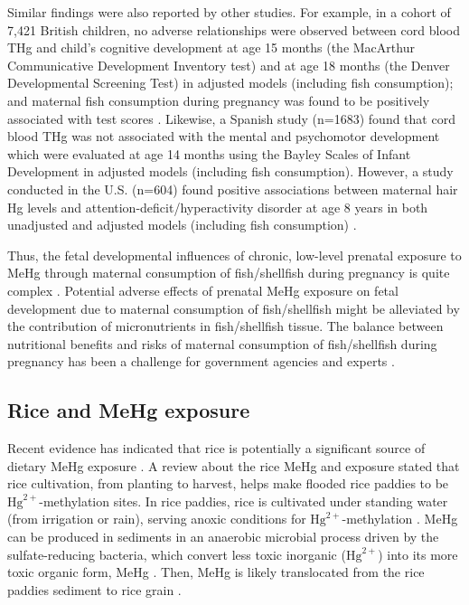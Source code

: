 Similar findings were also reported by other studies. For example, in a cohort of 7,421 British children, no adverse relationships were observed between cord blood THg and child's cognitive development at age 15 months (the MacArthur Communicative Development Inventory test) and at age 18 months (the Denver Developmental Screening Test) in adjusted models (including fish consumption); and maternal fish consumption during pregnancy was found to be positively associated with test scores \citep{daniels2004fish}. Likewise, a Spanish study (n=1683) found that cord blood THg was not associated with the mental and psychomotor development which were evaluated at age 14 months using the Bayley Scales of Infant Development \citep{llop2012prenatal} in adjusted models (including fish consumption). However, a study conducted in the U.S. (n=604) found positive associations between maternal hair Hg levels and attention-deficit/hyperactivity disorder at age 8 years in both unadjusted and adjusted models (including fish consumption) \citep{sagiv2012prenatal}.

Thus, the fetal developmental influences of chronic, low-level prenatal exposure to MeHg through maternal consumption of fish/shellfish during pregnancy is quite complex \citep{rice2004us,cohen2005quantitative}. Potential adverse effects of prenatal MeHg exposure on fetal development due to maternal consumption of fish/shellfish might be alleviated by the contribution of micronutrients in fish/shellfish tissue. The balance between nutritional benefits and risks of maternal consumption of fish/shellfish during pregnancy has been a challenge for government agencies and experts \citep{who1990mehg,national2000toxicological,usep2014fish}. 

\subsection{Rice and MeHg exposure}

Recent evidence has indicated that rice is potentially a significant source of dietary MeHg exposure \citep{li2010methylmercury,rothenberg2014rice}. A review about the rice MeHg and exposure \citep{rothenberg2014rice} stated that rice cultivation, from planting to harvest, helps make flooded rice paddies to be \(\text{Hg}^{2+}\)-methylation sites. In rice paddies, rice is cultivated under standing water (from irrigation or rain), serving anoxic conditions for \(\text{Hg}^{2+}\)-methylation \cite{rothenberg2014rice}. MeHg can be produced in sediments in an anaerobic microbial process driven by the sulfate-reducing bacteria, which convert less toxic inorganic (\(\text{Hg}^{2+}\)) into its more toxic organic form, MeHg \citep{rothenberg2014rice}. Then, MeHg is likely translocated from the rice paddies sediment to rice grain \citep{rothenberg2014rice}. 

